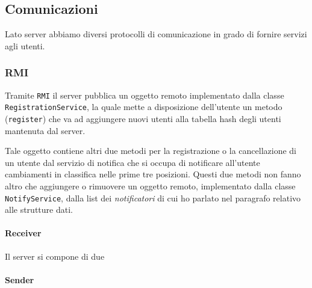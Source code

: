 \subsection{Comunicazioni}
Lato server abbiamo diversi protocolli di comunicazione in grado di fornire servizi agli utenti.

\subsubsection{RMI}
Tramite \verb|RMI| il server pubblica un oggetto remoto implementato dalla classe
\verb|RegistrationService|, la quale mette a disposizione dell'utente un metodo (\verb|register|)
che va ad aggiungere nuovi utenti alla tabella hash degli utenti mantenuta dal server.

Tale oggetto contiene altri due metodi per la registrazione o la cancellazione di un utente dal
servizio di notifica che si occupa di notificare all'utente cambiamenti in classifica nelle prime
tre posizioni. Questi due metodi non fanno altro che aggiungere o rimuovere un oggetto remoto,
implementato dalla classe \verb|NotifyService|, dalla list dei \emph{notificatori} di cui ho
parlato nel paragrafo relativo alle strutture dati.

\paragraph{Receiver}
Il server si compone di due

\paragraph{Sender}

